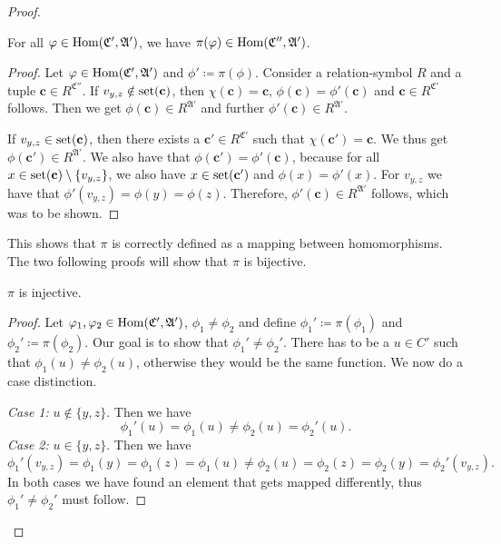 \begin{proof}
	\begin{claim}
		For all $\varphi\in \operatorname{Hom}(\mathfrak C',\mathfrak A')$, we have $\pi(\varphi)\in\operatorname{Hom}(\mathfrak C'',\mathfrak A')$.
	\end{claim}
	\begin{proof}
		Let $\varphi\in\operatorname{Hom}(\mathfrak C',\mathfrak A')$ and $\phi'\coloneqq \pi(\phi)$.
		Consider a relation-symbol $R$ and a tuple $\mathbf c \in R^{\mathfrak C''}$.
		If $v_{y,z}\notin\operatorname{set}(\mathbf c)$, then $\chi(\mathbf c)=\mathbf c$, $\phi(\mathbf c)=\phi'(\mathbf c)$ and $\mathbf c\in R^{\mathfrak C'}$ follows.
		Then we get $\phi(\mathbf c)\in R^{\mathfrak A'}$ and further $\phi'(\mathbf c)\in R^{\mathfrak A'}$.
		
		If $v_{y,z}\in\operatorname{set}(\mathbf c)$, then there exists a $\mathbf c'\in R^{\mathfrak C'}$ such that $\chi(\mathbf c')=\mathbf c$. 
		We thus get $\phi(\mathbf c')\in R^{\mathfrak A'}$.
		We also have that $\phi(\mathbf c')=\phi'(\mathbf c)$, because for all $x \in \operatorname{set}(\mathbf c)\setminus \{v_{y,z}\}$, we also have $x\in\operatorname{set}(\mathbf c')$ and $\phi(x)=\phi'(x)$.
		For $v_{y,z}$ we have that $\phi'(v_{y,z})=\phi(y)=\phi(z)$.
		Therefore, $\phi'(\mathbf c)\in R^{\mathfrak A'}$ follows, which was to be shown.
	\end{proof}
	
	This shows that $\pi$ is correctly defined as a mapping between homomorphisms.
	The two following proofs will show that $\pi$ is bijective.
	
	\begin{claim}
		$\pi$ is injective.
	\end{claim}
	\begin{proof}
		Let $\varphi_1,\varphi_2\in\operatorname{Hom}(\mathfrak C',\mathfrak A')$, $\phi_1\neq\phi_2$ and define $\phi_1'\coloneqq \pi(\phi_1)$ and $\phi_2'\coloneqq \pi(\phi_2)$.
		Our goal is to show that $\phi_1'\neq \phi_2'$.
		There has to be a $u\in C'$ such that $\phi_1(u)\neq\phi_2(u)$, otherwise they would be the same function.
		We now do a case distinction.
		
		\emph{Case 1:} $u\notin\{y,z\}$. Then we have
		$$\phi_1'(u)=\phi_1(u)\neq \phi_2(u)=\phi_2'(u).$$
		\emph{Case 2:} $u\in \{y,z\}$. Then we have 
		$$\phi_1'(v_{y,z})=\phi_1(y)=\phi_1(z)=\phi_1(u)\neq \phi_2(u)=\phi_2(z)=\phi_2(y)=\phi_2'(v_{y,z}).$$
		In both cases we have found an element that gets mapped differently, thus $\phi_1'\neq\phi_2'$ must follow.
	\end{proof}
	

\end{proof}
